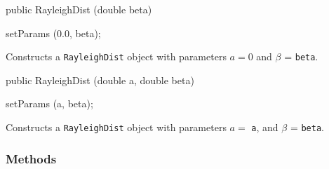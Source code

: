 \begin{code}

   public RayleighDist (double beta)\begin{hide} {
      setParams (0.0, beta);
   }\end{hide}
\end{code}
 \begin{tabb} Constructs a \texttt{RayleighDist} object with parameters
    $a = 0$ and $\beta$ = \texttt{beta}.
 \end{tabb}
\begin{code}

   public RayleighDist (double a, double beta)\begin{hide} {
      setParams (a, beta);
   }\end{hide}
\end{code}
\begin{tabb} Constructs a \texttt{RayleighDist} object with parameters 
     $a =$ \texttt{a}, and $\beta$ = \texttt{beta}.
 \end{tabb}

\subsubsection* {Methods}

